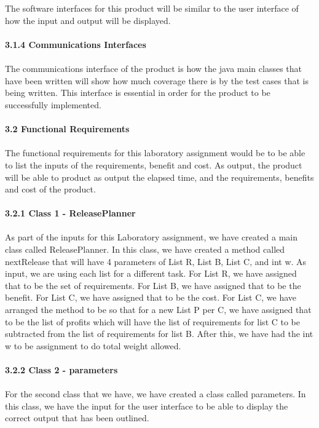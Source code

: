 \documentclass{article}
\begin{document}
\\
\\
The software interfaces for this product will be similar to the user interface of how the input and output will be displayed. 
\\
\\
\textbf{\hspace{8ex} 3.1.4 Communications Interfaces}
\\
\\
The communications interface of the product is how the java main classes that have been written will show how much coverage there is by the test cases that is being written. This interface is essential in order for the product to be successfully implemented.  
\\
\\
\textbf{\hspace{4ex} 3.2 Functional Requirements}
\\
\\
The functional requirements for this laboratory assignment would be to be able to list the inputs of the requirements, benefit and cost. As output, the product will be able to product as output the elapsed time, and the requirements, benefits and cost of the product.
\\
\\
\textbf{\hspace{8ex} 3.2.1 Class 1 - ReleasePlanner}
\\
\\
As part of the inputs for this Laboratory assignment, we have created a main class called ReleasePlanner. In this class, we have created a method called nextRelease that will have 4 parameters of List R, List B, List C, and int w. As input, we are using each list for a different task. For List R, we have assigned that to be the set of requirements. For List B, we have assigned that to be the benefit. For List C, we have assigned that to be the cost. For List C, we have arranged the method to be so that for a new List P per C, we have assigned that to be the list of profits which will have the list of requirements for list C to be subtracted from the list of requirements for list B. After this, we have had the int w to be assignment to do total weight allowed.
\\
\\
\textbf{\hspace{8ex} 3.2.2 Class 2 - parameters}
\\
\\
For the second class that we have, we have created a class called parameters. In this class, we have the input for the user interface to be able to display the correct output that has been outlined.
\end{document}
